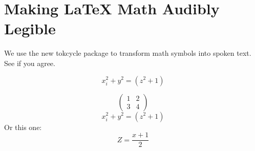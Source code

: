 \documentclass{article}
\newcommand{\mymat}[1]{\begin{pmatrix} #1 \end{pmatrix}}
\begin{document}
\section{Making \LaTeX{} Math Audibly Legible}
We use the new tokcycle package to transform math symbols into spoken text.
See if you agree.

\speakifytext
\begin{equation}
       x_i^2 + y^2 = (z^2 + 1)
    \end{equation}
    \endspeakifytext

    \speakifytext
    \begin{equation*}
        \mymat{ 1 & 2 \\ 3 & 4 }
     \end{equation*} 
    \endspeakifytext
\begin{equation}
    x_i^2 + y^2 = (z^2 + 1)
 \end{equation}
Or this one:
    \begin{equation}
       Z = \frac{x+1}{2}
    \end{equation}
\end{document}
